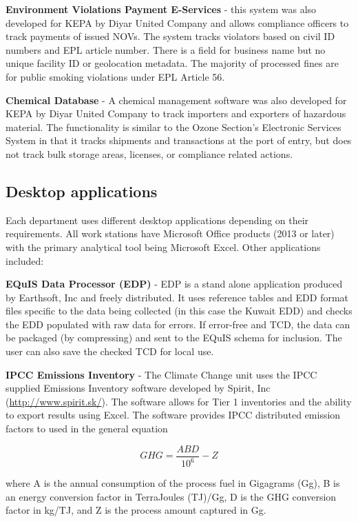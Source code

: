 \textbf{Environment Violations Payment E-Services} - this system was also developed for KEPA by Diyar United Company and allows compliance officers to track payments of issued NOVs. The system tracks violators based on civil ID numbers and EPL article number. There is a field for business name but no unique facility ID or geolocation metadata. The majority of processed fines are for public smoking violations under EPL Article 56.

\textbf{Chemical Database} - A chemical management software was also developed for KEPA by Diyar United Company to track importers and exporters of hazardous material. The functionality is similar to the Ozone Section's Electronic Services System in that it tracks shipments and transactions at the port of entry, but does not track bulk storage areas, licenses, or compliance related actions. 

\subsection{Desktop applications}

Each department uses different desktop applications depending on their requirements. All work stations have Microsoft Office products (2013 or later) with the primary analytical tool being Microsoft Excel. Other applications included:

\textbf{EQuIS Data Processor (EDP)} - EDP is a stand alone application produced by Earthsoft, Inc and freely distributed. It uses reference tables and EDD format files specific to the data being collected (in this case the Kuwait EDD) and checks the EDD populated with raw data for errors. If error-free and TCD, the data can be packaged (by compressing) and sent to the EQuIS schema for inclusion. The user can also save the checked TCD for local use.

\textbf{IPCC Emissions Inventory} - The Climate Change unit uses the IPCC supplied Emissions Inventory software developed by Spirit, Inc (\url{http://www.spirit.sk/}).  The software allows for Tier 1 inventories and the ability to export results using Excel. The software provides IPCC distributed emission factors to used in the general equation

\begin{equation}
\label{eq:GHGei}
GHG = \frac{ABD}{10^{6}} - Z
\end{equation}

\noindent
where A is the annual consumption of the process fuel in Gigagrams (Gg), B is an energy conversion factor in TerraJoules (TJ)/Gg, D is the GHG conversion factor in kg/TJ, and Z is the process amount captured in Gg.

